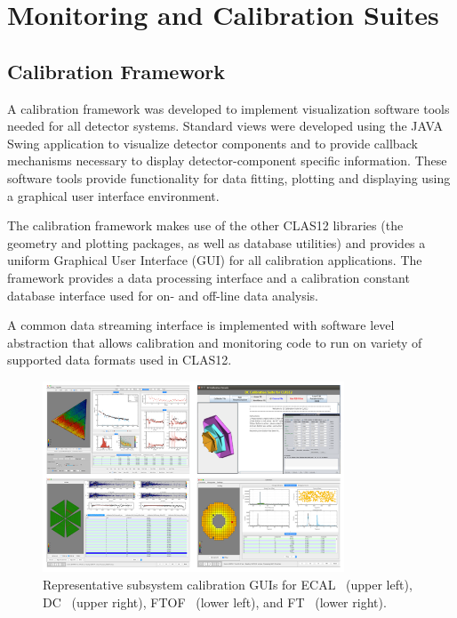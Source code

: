 \section{Monitoring and Calibration Suites}

\subsection{Calibration Framework}

A calibration framework was developed to implement visualization software tools needed for all detector
systems. Standard views were developed using the JAVA Swing application to visualize detector components and to provide callback
mechanisms necessary to display detector-component specific information.  These software tools provide
functionality for data fitting, plotting and displaying using a graphical user interface environment.

The calibration framework makes use of the other CLAS12 libraries
(the geometry and plotting packages, as well as database utilities) and provides a uniform Graphical User
Interface (GUI) for all calibration applications. The framework provides a data processing interface
and a calibration constant database interface used
for on- and off-line data analysis.

A common data streaming interface is implemented with software level abstraction that allows calibration and monitoring
code to run on variety of supported data formats used in CLAS12.

\begin{figure}
\centering
\includegraphics[width=0.8\textwidth]{pics/suites.png}
\caption{Representative subsystem calibration GUIs for ECAL~\cite{ecal-nim} (upper left),
DC~\cite{dc-nim} (upper right), FTOF~\cite{ftof-nim} (lower left),  and FT~\cite{ft-nim} (lower right).}
\label{suites}
\end{figure}

